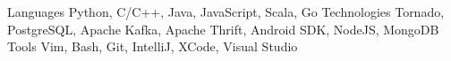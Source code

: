 \begin{cvskills}
  \cvskill
    {Languages}
    {Python, C/C++, Java, JavaScript, Scala, Go}
  \cvskill
    {Technologies}
    {Tornado, PostgreSQL, Apache Kafka, Apache Thrift, Android SDK, NodeJS, MongoDB}
  \cvskill
    {Tools}
    {Vim, Bash, Git, IntelliJ, XCode, Visual Studio}
\end{cvskills}
